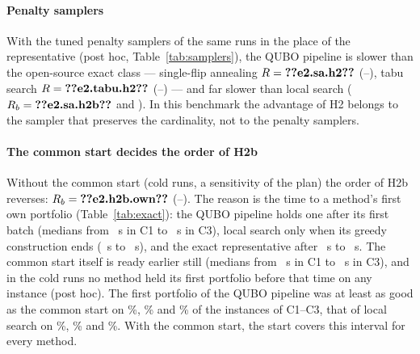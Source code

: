 \paragraph{Penalty samplers} With the tuned penalty samplers of the same runs in the place of the representative
(post hoc, Table~\ref{tab:samplers}), the QUBO pipeline is slower than the open-source exact class --- single-flip
annealing $R = \res{e2.sa.h2}$ (--), tabu search $R = \res{e2.tabu.h2}$
(--) --- and far slower than local search ($R_b = \res{e2.sa.h2b}$ and
). In this benchmark the advantage of H2 belongs to the sampler that preserves the cardinality, not to
the penalty samplers.

\begin{table}[t]
\centering\footnotesize\setlength{\tabcolsep}{3pt}
\caption{RQ2 with other QUBO samplers (post hoc): the same estimator with the tuned single-flip annealing (SA) and tabu
search of the same runs, both on the penalty QUBO, in the place of the representative swap-SA; cell estimates and the
pooled estimates over C1--C3 and C5 with \% intervals. $^{\dagger}$Descriptive cell.}\label{tab:samplers}

\end{table}

\paragraph{The common start decides the order of H2b} Without the common start (cold runs, a sensitivity of the plan)
the order of H2b reverses: $R_b = \res{e2.h2b.own}$ (--). The reason is
the time to a method's first own portfolio (Table~\ref{tab:exact}): the QUBO pipeline holds one after its first batch
(medians from ~s in C1 to ~s in C3), local search only when
its greedy construction ends (~s to ~s), and the exact
representative after ~s to ~s. The common start itself
is ready earlier still (medians from ~s in C1 to ~s in C3), and in the
cold runs no method held its first portfolio before that time on any instance (post hoc). The first portfolio of the
QUBO pipeline was at least as good as the common start on \%,
\% and \% of the instances of C1--C3, that of
local search on \%, \% and
\%. With the common start, the start covers this interval for every method.

